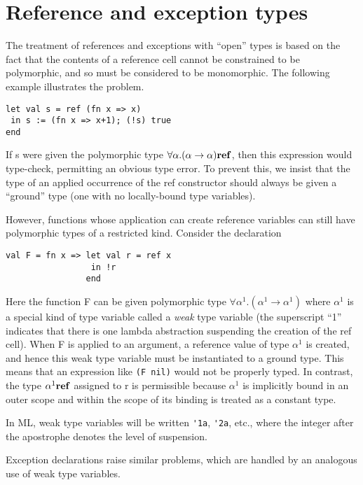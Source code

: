 \chapter{Reference and exception types}
\label{reftype}
The treatment of references and exceptions with ``open'' types
is based on the fact that the contents of a reference
cell cannot be constrained to be polymorphic, and so must be considered
to be monomorphic.  The following example illustrates the problem.
\begin{verbatim}
let val s = ref (fn x => x)
 in s := (fn x => x+1); (!s) true
end
\end{verbatim}
If s were given the polymorphic type 
$\forall \alpha . ( \alpha  \rightarrow \alpha ) {\bf ref}$, then this
expression would type-check, permitting an obvious type error.  To prevent
this, we insist that the type of an applied occurrence of the ref
constructor should always be given a ``ground'' type (one with no locally-bound
type variables).

However, functions whose application can create
reference variables can still have polymorphic types of a restricted
kind.  Consider the declaration
\begin{verbatim}
val F = fn x => let val r = ref x
                 in !r
                end
\end{verbatim}
Here the function F can be given polymorphic type
$\forall \alpha ^ 1 . (\alpha ^ 1 \rightarrow \alpha ^ 1)$
where $\alpha ^ 1$
is a special kind of type variable
called a {\em weak} type variable (the superscript ``1'' indicates that
there is one lambda abstraction suspending the creation of the
ref cell).  When F is applied to an argument, a reference value
of type $\alpha ^ 1$ is created, and hence this weak type
variable must be instantiated to a ground type.  This means that
an expression like \verb"(F nil)" would not be properly typed.  In contrast,
the type 
$\alpha ^ 1 {\bf ref}$
assigned to r is permissible because $\alpha ^ 1$ is implicitly
bound in an outer scope and within the scope of its binding is treated as
a constant type.

In ML, weak type variables will be written \verb"'1a", \verb"'2a",
etc., where the integer after the apostrophe denotes the level of
suspension.

Exception declarations raise similar problems, which are handled
by an analogous use of weak type variables.
